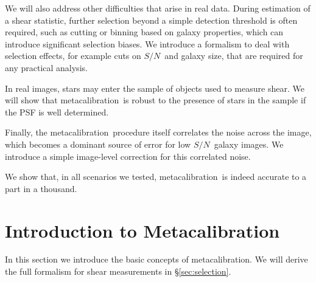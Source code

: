\documentclass[a4paper,fleqn,usenatbib]{mnras}
\newcommand{\snr}{$S/N$}
\newcommand{\mcal}{metacalibration}
\begin{document}
We will also address other difficulties that arise in real data.  During
estimation of a shear statistic, further selection beyond a simple detection
threshold is often required, such as cutting or binning based on galaxy
properties, which can introduce significant selection biases.  We introduce a
formalism to deal with selection effects, for example cuts on \snr\ and galaxy
size, that are required for any practical analysis. 

In real images, stars may enter the sample of objects used to measure shear. We
will show that \mcal\ is robust to the presence of stars in the sample if the
PSF is well determined.


Finally, the \mcal\ procedure itself correlates the noise across the image,
which becomes a dominant source of error for low \snr\ galaxy images.  We
introduce a simple image-level correction for this correlated noise.

We show that, in all scenarios we tested, \mcal\ is indeed accurate to a part
in a thousand.

\section{Introduction to Metacalibration} \label{sec:mcal}

In this section we introduce the basic concepts of \mcal. We will derive the
full formalism for shear measurements in \S \ref{sec:selection}.
\end{document}
